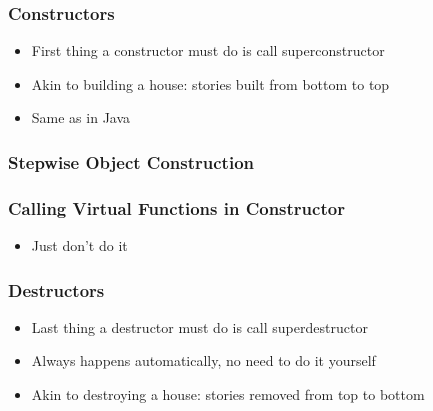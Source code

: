 \begin{frame}
  \tableofcontents[currentsection]
\end{frame}

\begin{frame}
  \frametitle{Constructors}
  \begin{itemize}
    \item First thing a constructor must do is call superconstructor
    \item Akin to building a house: stories built from bottom to top
    \item Same as in Java
  \end{itemize}
\end{frame}

\begin{frame}
  \frametitle{Stepwise Object Construction}
  \begin{center}
  \end{center}
\end{frame}

\begin{frame}
  \frametitle{Calling Virtual Functions in Constructor}
  \begin{itemize}
    \item Just don't do it
  \end{itemize}
\end{frame}

\begin{frame}
  \frametitle{Destructors}
  \begin{itemize}
    \item Last thing a destructor must do is call superdestructor
    \item Always happens automatically, no need to do it yourself
    \item Akin to destroying a house: stories removed from top to bottom
  \end{itemize}
\end{frame}

